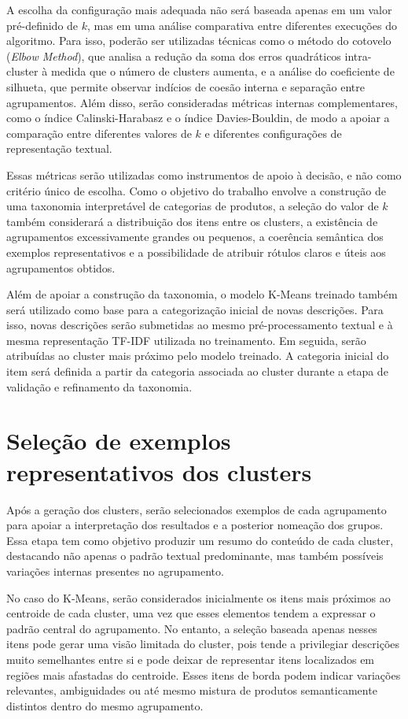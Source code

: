 \documentclass[english,brazilian]{UNISINOSmonografia}
\begin{document}
A escolha da configuração mais adequada não será baseada apenas em um valor pré-definido de $k$, mas em uma análise comparativa entre diferentes execuções do algoritmo. Para isso, poderão ser utilizadas técnicas como o método do cotovelo (\textit{Elbow Method}), que analisa a redução da soma dos erros quadráticos intra-cluster à medida que o número de clusters aumenta, e a análise do coeficiente de silhueta, que permite observar indícios de coesão interna e separação entre agrupamentos. Além disso, serão consideradas métricas internas complementares, como o índice Calinski-Harabasz e o índice Davies-Bouldin, de modo a apoiar a comparação entre diferentes valores de $k$ e diferentes configurações de representação textual.

Essas métricas serão utilizadas como instrumentos de apoio à decisão, e não como critério único de escolha. Como o objetivo do trabalho envolve a construção de uma taxonomia interpretável de categorias de produtos, a seleção do valor de $k$ também considerará a distribuição dos itens entre os clusters, a existência de agrupamentos excessivamente grandes ou pequenos, a coerência semântica dos exemplos representativos e a possibilidade de atribuir rótulos claros e úteis aos agrupamentos obtidos.


Além de apoiar a construção da taxonomia, o modelo K-Means treinado também será utilizado como base para a categorização inicial de novas descrições. Para isso, novas descrições serão submetidas ao mesmo pré-processamento textual e à mesma representação TF-IDF utilizada no treinamento. Em seguida, serão atribuídas ao cluster mais próximo pelo modelo treinado. A categoria inicial do item será definida a partir da categoria associada ao cluster durante a etapa de validação e refinamento da taxonomia.





\section{Seleção de exemplos representativos dos clusters}

Após a geração dos clusters, serão selecionados exemplos de cada agrupamento para apoiar a interpretação dos resultados e a posterior nomeação dos grupos. Essa etapa tem como objetivo produzir um resumo do conteúdo de cada cluster, destacando não apenas o padrão textual predominante, mas também possíveis variações internas presentes no agrupamento.

No caso do K-Means, serão considerados inicialmente os itens mais próximos ao centroide de cada cluster, uma vez que esses elementos tendem a expressar o padrão central do agrupamento. No entanto, a seleção baseada apenas nesses itens pode gerar uma visão limitada do cluster, pois tende a privilegiar descrições muito semelhantes entre si e pode deixar de representar itens localizados em regiões mais afastadas do centroide. Esses itens de borda podem indicar variações relevantes, ambiguidades ou até mesmo mistura de produtos semanticamente distintos dentro do mesmo agrupamento.
\end{document}
